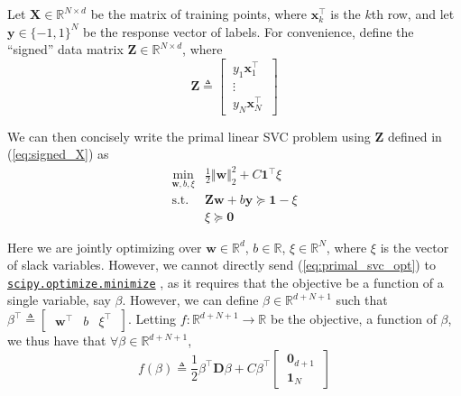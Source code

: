 \documentclass{article}
\numberwithin{equation}{section}
\newcommand{\minimize}{%
    \href{%
        https://docs.scipy.org/doc/scipy/reference/generated/%
        scipy.optimize.minimize.html%
    }{\texttt{scipy.optimize.minimize}}%
}
\begin{document}
Let $ \mathbf{X} \in \mathbb{R}^{N \times d} $ be the matrix of training
points, where $ \mathbf{x}_k^\top $ is the $ k $th row, and let
$ \mathbf{y} \in \{-1, 1\}^N $ be the response vector of labels. For
convenience, define the ``signed'' data matrix
$ \mathbf{Z} \in \mathbb{R}^{N \times d} $, where
\begin{equation} \label{eq:signed_X}
    \mathbf{Z} \triangleq \begin{bmatrix}
        \ y_1\mathbf{x}_1^\top \ \\ \ \vdots \ \\ \ y_N\mathbf{x}_N^\top \
    \end{bmatrix}
\end{equation}

We can then concisely write the primal linear SVC problem using
$ \mathbf{Z} $ defined in (\ref{eq:signed_X}) as
\begin{equation} \label{eq:primal_svc_opt}
    \begin{array}{ll}
        \displaystyle\min_{\mathbf{w}, b, \xi} &
            \frac{1}{2}\Vert\mathbf{w}\Vert_2^2 +
            C\mathbf{1}^\top\xi \\
        \text{s.t.} & \mathbf{Zw} + b\mathbf{y} \succeq
            \mathbf{1} - \xi  \\
            & \xi \succeq \mathbf{0}
    \end{array}
\end{equation}

Here we are jointly optimizing over $ \mathbf{w} \in \mathbb{R}^d $,
$ b \in \mathbb{R} $, $ \xi \in \mathbb{R}^N $, where $ \xi $ is the vector
of slack variables. However, we cannot directly send (\ref{eq:primal_svc_opt})
to \minimize, as it requires that the objective be a function of a single
variable, say $ \beta $. However, we can define $ \beta \in
\mathbb{R}^{d + N + 1} $ such that $ \beta^\top \triangleq
\begin{bmatrix} \ \mathbf{w}^\top & b & \xi^\top \ \end{bmatrix} $. Letting
$ f : \mathbb{R}^{d + N + 1} \rightarrow \mathbb{R} $ be the objective, a
function of $ \beta $, we thus have that $ \forall \beta \in
\mathbb{R}^{d + N + 1} $,
\begin{equation} \label{eq:primal_obj_joint}
    f(\beta) \triangleq \frac{1}{2}\beta^\top\mathbf{D}\beta +
    C\beta^\top\begin{bmatrix}
        \ \mathbf{0}_{d + 1} \ \\ \ \mathbf{1}_N \
    \end{bmatrix}
\end{equation}
\end{document}
